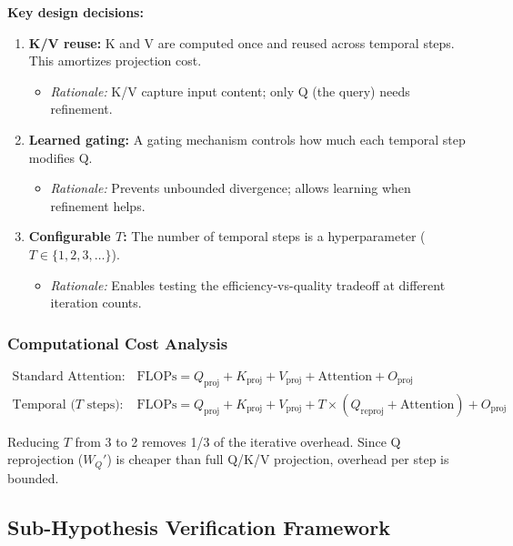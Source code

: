 \textbf{Key design decisions:}

\begin{enumerate}
    \item \textbf{K/V reuse:} K and V are computed once and reused across temporal steps. This amortizes projection cost.
    \begin{itemize}
        \item \emph{Rationale:} K/V capture input content; only Q (the query) needs refinement.
    \end{itemize}

    \item \textbf{Learned gating:} A gating mechanism controls how much each temporal step modifies Q.
    \begin{itemize}
        \item \emph{Rationale:} Prevents unbounded divergence; allows learning when refinement helps.
    \end{itemize}

    \item \textbf{Configurable $T$:} The number of temporal steps is a hyperparameter ($T \in \{1, 2, 3, \ldots\}$).
    \begin{itemize}
        \item \emph{Rationale:} Enables testing the efficiency-vs-quality tradeoff at different iteration counts.
    \end{itemize}
\end{enumerate}

\subsubsection{Computational Cost Analysis}

\begin{align}
\text{Standard Attention:} \quad & \text{FLOPs} = Q_{\text{proj}} + K_{\text{proj}} + V_{\text{proj}} + \text{Attention} + O_{\text{proj}} \nonumber \\
\text{Temporal ($T$ steps):} \quad & \text{FLOPs} = Q_{\text{proj}} + K_{\text{proj}} + V_{\text{proj}} + T \times (Q_{\text{reproj}} + \text{Attention}) + O_{\text{proj}} \nonumber
\end{align}

Reducing $T$ from 3 to 2 removes 1/3 of the iterative overhead. Since Q reprojection ($W_Q'$) is cheaper than full Q/K/V projection, overhead per step is bounded.

\subsection{Sub-Hypothesis Verification Framework}

